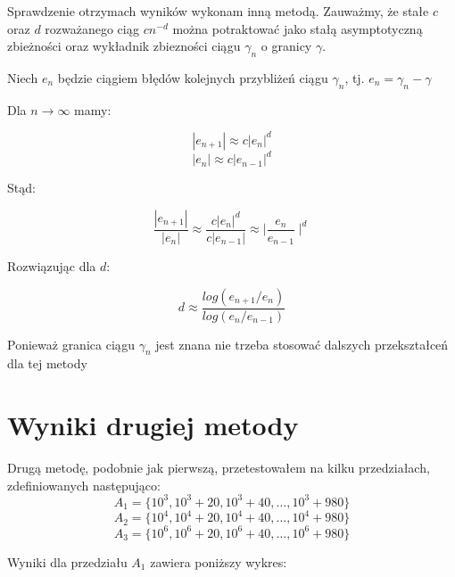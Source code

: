 \documentclass[11pt,wide]{mwart}
\begin{document}
Sprawdzenie otrzymach wyników wykonam inną metodą. Zauważmy, że stałe $c$ oraz $d$ rozważanego ciąg $cn^{-d}$ można potraktować jako stałą asymptotyczną zbieżności
oraz wykładnik zbiezności ciągu $\gamma_n$ o granicy $\gamma$. 

Niech $e_n$ będzie ciągiem błędów kolejnych przybliżeń ciągu $\gamma_n$, tj. $e_n = \gamma_n - \gamma$\\
\begin{samepage}
Dla $n \to \infty$ mamy:

\begin{equation}
|e_{n+1}| \approx c|e_n|^d 
\end{equation}
\begin{equation}
|e_{n}| \approx c|e_{n-1}|^d
\end{equation}

\end{samepage}

\begin{samepage}
Stąd: 

\begin{equation}
\frac{|e_{n+1}|}{|e_{n}|} \approx \frac{c|e_{n}|^d}{c|e_{n-1}|} \approx \mid \frac{e_n}{e_{n-1}} \mid^d
\end{equation}
\end{samepage}


\begin{samepage}
Rozwiązując dla $d$:

\begin{equation}
d \approx \frac{log(e_{n+1} / e_n)}{log(e_{n} / e_{n-1})}
\end{equation}

Ponieważ granica ciągu $\gamma_n$ jest znana nie trzeba stosować dalszych przekształceń dla tej metody

\end{samepage}


\section{Wyniki drugiej metody}

Drugą metodę, podobnie jak pierwszą, przetestowałem na kilku przedziałach, zdefiniowanych następująco:
$$
A_1 = \{10^3, 10^3+20, 10^3+40, \dots, 10^3+980\}
$$
$$
A_2 = \{10^4, 10^4+20, 10^4+40, \dots, 10^4+980\}
$$
$$
A_3 = \{10^6, 10^6+20, 10^6+40, \dots, 10^6+980\}
$$


Wyniki dla przedziału $A_1$ zawiera poniższy wykres:
\end{document}
